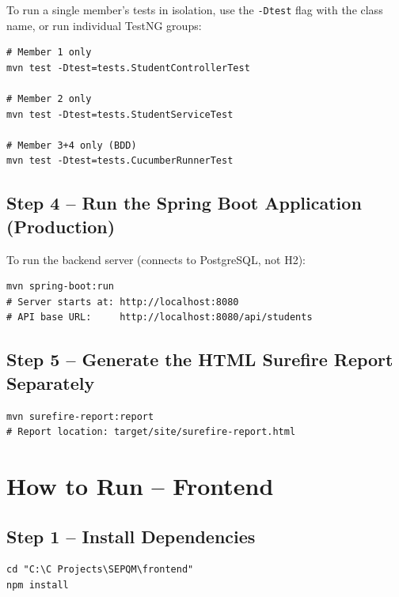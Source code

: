 \documentclass[12pt,a4paper]{article}
\begin{document}
To run a single member's tests in isolation, use the \texttt{-Dtest} flag with the
class name, or run individual TestNG groups:

\begin{lstlisting}[style=shellStyle, numbers=none, caption={Run individual member tests}]
# Member 1 only
mvn test -Dtest=tests.StudentControllerTest

# Member 2 only
mvn test -Dtest=tests.StudentServiceTest

# Member 3+4 only (BDD)
mvn test -Dtest=tests.CucumberRunnerTest
\end{lstlisting}

\subsection{Step 4 -- Run the Spring Boot Application (Production)}

To run the backend server (connects to PostgreSQL, not H2):

\begin{lstlisting}[style=shellStyle, numbers=none, caption={Start the backend server}]
mvn spring-boot:run
# Server starts at: http://localhost:8080
# API base URL:     http://localhost:8080/api/students
\end{lstlisting}

\subsection{Step 5 -- Generate the HTML Surefire Report Separately}

\begin{lstlisting}[style=shellStyle, numbers=none, caption={Generate HTML report only}]
mvn surefire-report:report
# Report location: target/site/surefire-report.html
\end{lstlisting}

\section{How to Run -- Frontend}

\subsection{Step 1 -- Install Dependencies}

\begin{lstlisting}[style=shellStyle, numbers=none, caption={Install frontend npm packages}]
cd "C:\C Projects\SEPQM\frontend"
npm install
\end{lstlisting}
\end{document}
